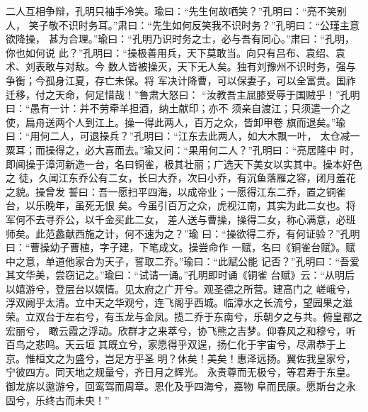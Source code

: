 二人互相争辩，孔明只袖手冷笑。瑜曰：“先生何故哂笑？”孔明曰：“亮不笑别人，
笑子敬不识时务耳。”肃曰：“先生如何反笑我不识时务？”孔明曰：“公瑾主意欲降操，
甚为合理。”瑜曰：“孔明乃识时务之士，必与吾有同心。”肃曰：“孔明，你也如何说
此？”孔明曰：“操极善用兵，天下莫敢当。向只有吕布、袁绍、袁术、刘表敢与对敌。今
数人皆被操灭，天下无人矣。独有刘豫州不识时务，强与争衡；今孤身江夏，存亡未保。将
军决计降曹，可以保妻子，可以全富贵。国祚迁移，付之天命，何足惜哉！”鲁肃大怒曰：
“汝教吾主屈膝受辱于国贼乎！”孔明曰：“愚有一计：并不劳牵羊担酒，纳土献印；亦不
须亲自渡江；只须遣一介之使，扁舟送两个人到江上。操一得此两人，百万之众，皆卸甲卷
旗而退矣。”瑜曰：“用何二人，可退操兵？”孔明曰：“江东去此两人，如大木飘一叶，
太仓减一粟耳；而操得之，必大喜而去。”瑜又问：“果用何二人？”孔明曰：“亮居隆中
时，即闻操于漳河新造一台，名曰铜雀，极其壮丽；广选天下美女以实其中。操本好色之
徒，久闻江东乔公有二女，长曰大乔，次曰小乔，有沉鱼落雁之容，闭月羞花之貌。操曾发
誓曰：吾一愿扫平四海，以成帝业；一愿得江东二乔，置之铜雀台，以乐晚年，虽死无恨
矣。今虽引百万之众，虎视江南，其实为此二女也。将军何不去寻乔公，以千金买此二女，
差人送与曹操，操得二女，称心满意，必班师矣。此范蠡献西施之计，何不速为之？”瑜
曰：“操欲得二乔，有何证验？”孔明曰：“曹操幼子曹植，字子建，下笔成文。操尝命作
一赋，名曰《铜雀台赋》。赋中之意，单道他家合为天子，誓取二乔。”瑜曰：“此赋公能
记否？”孔明曰：“吾爱其文华美，尝窃记之。”瑜曰：“试请一诵。”孔明即时诵《铜雀
台赋》云：“从明后以嬉游兮，登层台以娱情。见太府之广开兮。观圣德之所营。建高门之
嵯峨兮，浮双阙乎太清。立中天之华观兮，连飞阁乎西城。临漳水之长流兮，望园果之滋
荣。立双台于左右兮，有玉龙与金凤。揽二乔于东南兮，乐朝夕之与共。俯皇都之宏丽兮，
瞰云霞之浮动。欣群才之来萃兮，协飞熊之吉梦。仰春风之和穆兮，听百鸟之悲鸣。天云垣
其既立兮，家愿得乎双逞，扬仁化于宇宙兮，尽肃恭于上京。惟桓文之为盛兮，岂足方乎圣
明？休矣！美矣！惠泽远扬。翼佐我皇家兮，宁彼四方。同天地之规量兮，齐日月之辉光。
永贵尊而无极兮，等君寿于东皇。御龙旂以遨游兮，回鸾驾而周章。恩化及乎四海兮，嘉物
阜而民康。愿斯台之永固兮，乐终古而未央！”

